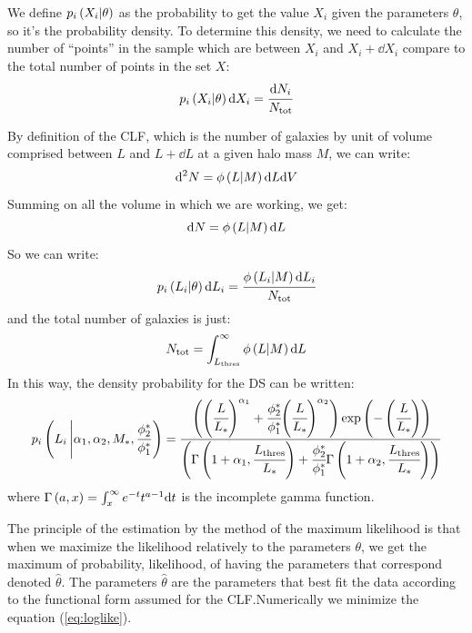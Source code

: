 We define $p_i\left({X_i|\theta}\right)$ as the probability to get the value $X_i$
given the parameters $\theta$, so it's the probability density. To determine
this density, we need to calculate the number of ``points'' in the sample which
are between $X_i$ and $X_i+\dd{X_i}$ compare to the total number of points in
the set $X$:
%
\begin{equation}
    p_i\left({X_i|\theta}\right){\rm{d}}{X_i} = \cfrac{{\rm{d}}{N_i}}{N_{\mathrm{tot}}}
\end{equation}

By definition of the CLF, which is the number of galaxies by unit of volume
comprised between $L$ and $L+\dd{L}$ at a given halo mass $M$, we can write:
%
\begin{equation}
    {\rm{d}}^2{N}=\phi\left({L|M}\right){\rm{d}}{L}{\rm{d}}{V}
\end{equation}
%
Summing on all the volume in which we are working, we get:
%
\begin{equation}
    {\rm{d}}{N}=\phi\left({L|M}\right){\rm{d}}{L}
\end{equation}
%
%
So we can write:
%
\begin{equation}
    p_i\left({L_i|\theta}\right){\rm{d}}{L_i} = \cfrac{\phi\left({L_i|M}\right){\rm{d}}{L_i}}{N_{\mathrm{tot}}}
\end{equation}
%
and the total number of galaxies is just:
%
\begin{equation}
    N_{\mathrm{tot}}=\int_{L_{\mathrm{thres}}}^\infty{\phi\left({L|M}\right){\rm{d}}{L}}
\end{equation}
%
In this way, the density probability for the DS can be written:
%
\begin{equation}
    p_i\left({L_i\left|\alpha_1, \alpha_2, M_*, \cfrac{\phi_2^*}{\phi_1^*}\right.}\right)=\cfrac{\left({{\left({\cfrac{L}{L_*}}\right)}^{\alpha_1}
    +\cfrac{\phi_2^*}{\phi_1^*} {\left({\cfrac{L}{L_*}}\right)}^{\alpha_2}}\right)\exp\left({-\left({\cfrac{L}{L_*}}\right)}\right)}{\left({\Gamma\left({1+\alpha_1,
    \cfrac{L_{\mathrm{thres}}}{L_*}}\right)+\cfrac{\phi_2^*}{\phi_1^*}\Gamma\left({1+\alpha_2,\cfrac{L_{\mathrm{thres}}}{L_*}}\right)}\right)}
\end{equation}
%
where $\Gamma\left({a,x}\right)=\int_x^{\infty}e^{-t}{t^{a-1}}{\rm{d}}{t}$ is the
incomplete gamma function.

The principle of the estimation by the method of the maximum likelihood is that
when we maximize the likelihood relatively to the parameters $\theta$, we get
the maximum of probability, likelihood, of having the parameters that
correspond denoted $\hat{\theta}$. The parameters $\hat{\theta}$ are the
parameters that best fit the data according to the functional form assumed for
the CLF.\@ Numerically we minimize the equation (\ref{eq:loglike}).

